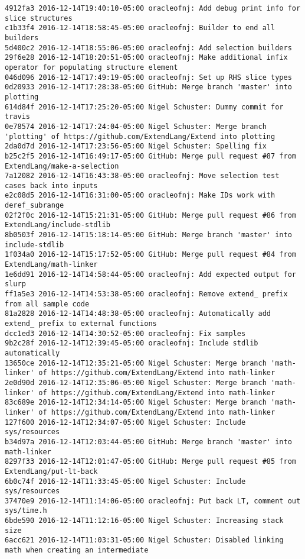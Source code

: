 \begin{lstlisting}
4912fa3 2016-12-14T19:40:10-05:00 oracleofnj: Add debug print info for slice structures
c1b33f4 2016-12-14T18:58:45-05:00 oracleofnj: Builder to end all builders
5d400c2 2016-12-14T18:55:06-05:00 oracleofnj: Add selection builders
29f6e28 2016-12-14T18:20:51-05:00 oracleofnj: Make additional infix operator for populating structure element
046d096 2016-12-14T17:49:19-05:00 oracleofnj: Set up RHS slice types
0d20933 2016-12-14T17:28:38-05:00 GitHub: Merge branch 'master' into plotting
614d84f 2016-12-14T17:25:20-05:00 Nigel Schuster: Dummy commit for travis
0e78574 2016-12-14T17:24:04-05:00 Nigel Schuster: Merge branch 'plotting' of https://github.com/ExtendLang/Extend into plotting
2da0d7d 2016-12-14T17:23:56-05:00 Nigel Schuster: Spelling fix
b25c2f5 2016-12-14T16:49:17-05:00 GitHub: Merge pull request #87 from ExtendLang/make-a-selection
7a12082 2016-12-14T16:43:38-05:00 oracleofnj: Move selection test cases back into inputs
e2c08d5 2016-12-14T16:31:00-05:00 oracleofnj: Make IDs work with deref_subrange
02f2f0c 2016-12-14T15:21:31-05:00 GitHub: Merge pull request #86 from ExtendLang/include-stdlib
8b0503f 2016-12-14T15:18:14-05:00 GitHub: Merge branch 'master' into include-stdlib
1f034a0 2016-12-14T15:17:52-05:00 GitHub: Merge pull request #84 from ExtendLang/math-linker
1e6dd91 2016-12-14T14:58:44-05:00 oracleofnj: Add expected output for slurp
ff1a5e3 2016-12-14T14:53:38-05:00 oracleofnj: Remove extend_ prefix from all sample code
81a2828 2016-12-14T14:48:38-05:00 oracleofnj: Automatically add extend_ prefix to external functions
dcc1ed3 2016-12-14T14:30:52-05:00 oracleofnj: Fix samples
9b2c28f 2016-12-14T12:39:45-05:00 oracleofnj: Include stdlib automatically
13650ce 2016-12-14T12:35:21-05:00 Nigel Schuster: Merge branch 'math-linker' of https://github.com/ExtendLang/Extend into math-linker
2e0d90d 2016-12-14T12:35:06-05:00 Nigel Schuster: Merge branch 'math-linker' of https://github.com/ExtendLang/Extend into math-linker
83c689e 2016-12-14T12:34:14-05:00 Nigel Schuster: Merge branch 'math-linker' of https://github.com/ExtendLang/Extend into math-linker
127f600 2016-12-14T12:34:07-05:00 Nigel Schuster: Include sys/resources
b34d97a 2016-12-14T12:03:44-05:00 GitHub: Merge branch 'master' into math-linker
8297f33 2016-12-14T12:01:47-05:00 GitHub: Merge pull request #85 from ExtendLang/put-lt-back
6b0c74f 2016-12-14T11:33:45-05:00 Nigel Schuster: Include sys/resources
37470e9 2016-12-14T11:14:06-05:00 oracleofnj: Put back LT, comment out sys/time.h
6bde590 2016-12-14T11:12:16-05:00 Nigel Schuster: Increasing stack size
6acc621 2016-12-14T11:03:31-05:00 Nigel Schuster: Disabled linking math when creating an intermediate

\end{lstlisting}
